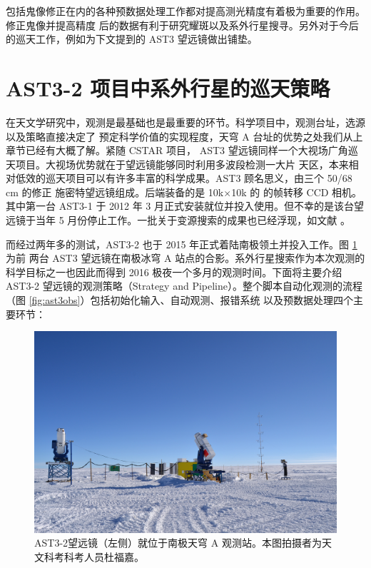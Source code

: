 包括鬼像修正在内的各种预数据处理工作都对提高测光精度有着极为重要的作用。修正鬼像并提高精度
后的数据有利于研究耀斑以及系外行星搜寻\cite{Liang2016,Wang2014CSTAR}。另外对于今后的巡天工作，例如为下文提到的 AST3 望远镜做出铺垫\cite{Cui2008}。


\section{AST3-2 项目中系外行星的巡天策略} \label{sec:ast3}

在天文学研究中，观测是最基础也是最重要的环节。科学项目中，观测台址，选源以及策略直接决定了
预定科学价值的实现程度，天穹 A 台址的优势之处我们从上章节已经有大概了解。紧随 CSTAR 项目，
AST3 望远镜同样一个大视场广角巡天项目。大视场优势就在于望远镜能够同时利用多波段检测一大片
天区，本来相对低效的巡天项目可以有许多丰富的科学成果。AST3 顾名思义，由三个 50/68 cm 的修正
施密特望远镜组成。后端装备的是 10k$\times$10k 的 的帧转移 CCD 相机。其中第一台 AST3-1 于 2012 年 3 月正式安装就位并投入使用。但不幸的是该台望远镜于当年 5 月份停止工作。一批关于变源搜索的成果也已经浮现，如文献 \cite{Li2015,Wang2017}。

而经过两年多的测试，AST3-2 也于 2015 年正式着陆南极领土并投入工作。图 \ref{fig:ast3tele} 为前
两台 AST3 望远镜在南极冰穹 A 站点的合影。系外行星搜索作为本次观测的科学目标之一也因此而得到 
2016 极夜一个多月的观测时间。下面将主要介绍 AST3-2 望远镜的观测策略（Strategy and 
Pipeline）。整个脚本自动化观测的流程（图 \ref{fig:ast3obs}）包括初始化输入、自动观测、报错系统
以及预数据处理四个主要环节：


\begin{figure}[t]
\centering
\includegraphics[width=1.0\textwidth]{figures/chapter2/f11_ast3.jpg}
\caption{AST3-2望远镜（左侧）就位于南极天穹 A 观测站。本图拍摄者为天文科考科考人员杜福嘉。}
\label{fig:ast3tele}
\end{figure}

